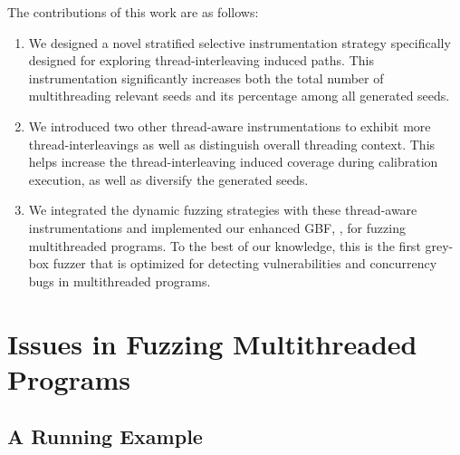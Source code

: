 The contributions of this work are as follows:
\begin{enumerate}[1)]
\item We designed a novel stratified selective instrumentation strategy specifically designed for exploring thread-interleaving induced paths. This instrumentation significantly increases both the total number of multithreading relevant seeds and its percentage among all generated seeds.
\item We introduced two other thread-aware instrumentations to exhibit more thread-interleavings as well as distinguish overall threading context. This helps increase the thread-interleaving induced coverage during calibration execution, as well as diversify the generated seeds.
\item We integrated the dynamic fuzzing strategies with these thread-aware instrumentations and implemented our enhanced GBF, \mtfuzz, for fuzzing multithreaded programs. To the best of our knowledge, this is the first grey-box fuzzer that is optimized for detecting vulnerabilities and concurrency bugs in  multithreaded programs.
\end{enumerate}




\section{Issues in Fuzzing Multithreaded Programs}\label{sec:motivation}

\subsection{A Running Example}\label{sec:example}



